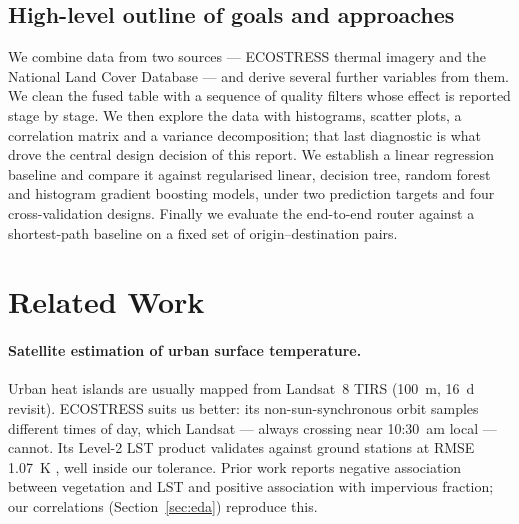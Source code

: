 \documentclass[10pt]{article}   %
\begin{document}
\subsection{High-level outline of goals and approaches}
We combine data from two sources --- ECOSTRESS thermal imagery and the National Land Cover
Database --- and derive several further variables from them. We clean the fused table with a
sequence of quality filters whose effect is reported stage by stage. We then explore the data
with histograms, scatter plots, a correlation matrix and a variance decomposition; that last
diagnostic is what drove the central design decision of this report. We establish a linear
regression baseline and compare it against regularised linear, decision tree, random forest
and histogram gradient boosting models, under two prediction targets and four
cross-validation designs. Finally we evaluate the end-to-end router against a shortest-path
baseline on a fixed set of origin--destination pairs.

\section{Related Work}
\label{sec:related}

\paragraph{Satellite estimation of urban surface temperature.}
Urban heat islands are usually mapped from Landsat~8 TIRS (\SI{100}{\metre},
\SI{16}{\day} revisit). ECOSTRESS \citep{fisher2020ecostress} suits us better: its
non-sun-synchronous orbit samples different times of day, which Landsat --- always crossing
near 10:30~am local --- cannot. Its Level-2 LST product validates against ground stations at
RMSE \SI{1.07}{\kelvin} \citep{hulley2021validation}, well inside our tolerance. Prior work
reports negative association between vegetation and LST and positive association with
impervious fraction; our correlations (Section~\ref{sec:eda}) reproduce this.
\end{document}
